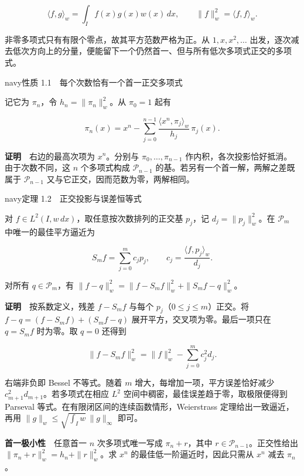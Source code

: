 \documentclass[11pt,a4paper]{article}
\begin{document}
\[
\langle f,g\rangle_w=\int_I f(x)g(x)w(x)\,dx,\qquad
\|f\|_w^2=\langle f,f\rangle_w .
\]

非零多项式只有有限个零点，故其平方范数严格为正。从 \(1,x,x^2,\ldots\) 出发，逐次减去低次方向上的分量，便能留下一个仍然首一、但与所有低次多项式正交的多项式。

\begin{sboxenv}{navy}{性质 1.1　每个次数恰有一个首一正交多项式}

记它为 \(\pi_n\)，令 \(h_n=\|\pi_n\|_w^2\)。从 \(\pi_0=1\) 起有

\[
\pi_n(x)=x^n-\sum_{j=0}^{n-1}
\frac{\langle x^n,\pi_j\rangle_w}{h_j}\,\pi_j(x).
\]

\end{sboxenv}

\textbf{证明}　右边的最高次项为 \(x^n\)。分别与 \(\pi_0,\ldots,\pi_{n-1}\) 作内积，各次投影恰好抵消。由于次数不同，这 \(n\) 个多项式构成 \(\mathcal P_{n-1}\) 的基。若另有一个首一解，两解之差既属于 \(\mathcal P_{n-1}\) 又与它正交，因而范数为零，两解相同。

\begin{sboxenv}{navy}{定理 1.2　正交投影与误差恒等式}

对 \(f\in L^2(I,w\,dx)\)，取任意按次数排列的正交基 \(p_j\)，记 \(d_j=\|p_j\|_w^2\)。在 \(\mathcal P_m\) 中唯一的最佳平方逼近为

\[
S_m f=\sum_{j=0}^m c_jp_j,\qquad c_j=\frac{\langle f,p_j\rangle_w}{d_j}.
\]

对所有 \(q\in\mathcal P_m\)，有 \(\|f-q\|_w^2=\|f-S_m f\|_w^2+\|S_m f-q\|_w^2\)。

\end{sboxenv}

\textbf{证明}　按系数定义，残差 \(f-S_m f\) 与每个 \(p_j\)（\(0\le j\le m\)）正交。将 \(f-q=(f-S_m f)+(S_m f-q)\) 展开平方，交叉项为零。最后一项只在 \(q=S_m f\) 时为零。取 \(q=0\) 还得到

\[
\|f-S_m f\|_w^2=\|f\|_w^2-\sum_{j=0}^m c_j^2 d_j .
\]

右端非负即 Bessel 不等式。随着 \(m\) 增大，每增加一项，平方误差恰好减少 \(c_{m+1}^2 d_{m+1}\)。若多项式在相应 \(L^2\) 空间中稠密，最佳误差趋于零，取极限便得到 Parseval 等式。在有限闭区间的连续函数情形，Weierstrass 定理给出一致逼近，再用 \(\|g\|_w\le\sqrt{\int_I w}\,\|g\|_\infty\) 即可。

\textbf{首一极小性}　任意首一 \(n\) 次多项式唯一写成 \(\pi_n+r\)，其中 \(r\in\mathcal P_{n-1}\)。正交性给出 \(\|\pi_n+r\|_w^2=h_n+\|r\|_w^2\)。求 \(x^n\) 的最佳低一阶逼近时，因此只需从 \(x^n\) 减去 \(\pi_n\)。
\end{document}
